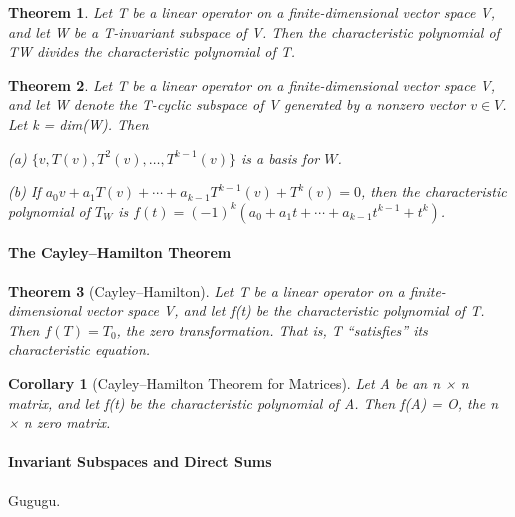 \documentclass{article}
\theoremstyle{plain}
\newtheorem{theorem}{Theorem}[section]
\newtheorem*{corollary}{Corollary}
\theoremstyle{plain} %
\begin{document}
\begin{theorem}
  Let T be a linear operator on a finite-dimensional vector space V, and let W be a T-invariant subspace of V. Then the characteristic polynomial of TW divides the characteristic polynomial of T.
\end{theorem}

\begin{theorem}
  Let T be a linear operator on a finite-dimensional vector space V, and let W denote the T-cyclic subspace of V generated by a nonzero vector $v \in V$. Let k = dim(W). Then

  (a) $\{v,T(v), T^2(v), \ldots, T^{k-1}(v)\}$ is a basis for $W$.

  (b) If $a_0v +a_1T(v)+\cdots+a_{k−1}T^{k−1}(v)+T^k(v) = 0$, then the characteristic   polynomial of $T_W$ is $f(t)=(−1)^{k}(a_0 + a_1t + \cdots + a_{k−1}t^{k−1} + t^k)$.
\end{theorem}

\paragraph{The Cayley–Hamilton Theorem}

\begin{theorem}[Cayley–Hamilton]
  Let T be a linear operator on a finite-dimensional vector space V, and let f(t) be the characteristic polynomial of T. Then $f(T) = T_0$, the zero transformation. That is, T “satisfies” its characteristic equation.
\end{theorem}

\begin{corollary}[Cayley–Hamilton Theorem for Matrices]
  Let A be an n × n matrix, and let f(t) be the characteristic polynomial of A. Then f(A) = O, the n × n zero matrix.
\end{corollary}

\paragraph {Invariant Subspaces and Direct Sums}

Gugugu.
\end{document}
